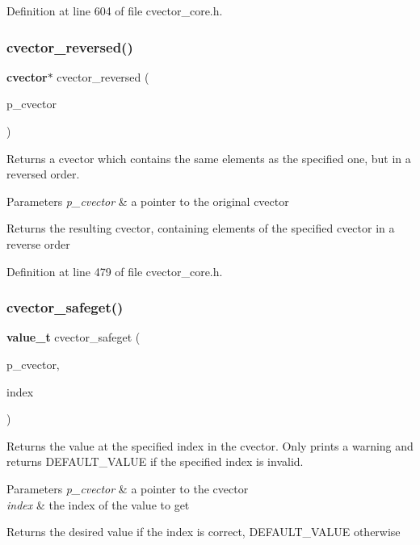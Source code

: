 Definition at line 604 of file cvector\+\_\+core.\+h.

\mbox{\label{cvector__core_8h_af9185ec558ef030b082daee234f9312a}} 
\subsubsection{cvector\+\_\+reversed()}
{\footnotesize\ttfamily \textbf{ cvector}$\ast$ cvector\+\_\+reversed (\begin{DoxyParamCaption}\item[{\textbf{ cvector} $\ast$}]{p\+\_\+cvector }\end{DoxyParamCaption})}

Returns a cvector which contains the same elements as the specified one, but in a reversed order. 
\begin{DoxyParams}{Parameters}
{\em p\+\_\+cvector} & a pointer to the original cvector \\
\hline
\end{DoxyParams}
\begin{DoxyReturn}{Returns}
the resulting cvector, containing elements of the specified cvector in a reverse order 
\end{DoxyReturn}


Definition at line 479 of file cvector\+\_\+core.\+h.

\mbox{\label{cvector__core_8h_a41b0ee17ac9cdc9967afb1dca8f9236a}} 
\subsubsection{cvector\+\_\+safeget()}
{\footnotesize\ttfamily \textbf{ value\+\_\+t} cvector\+\_\+safeget (\begin{DoxyParamCaption}\item[{\textbf{ cvector} $\ast$}]{p\+\_\+cvector,  }\item[{\textbf{ index\+\_\+t}}]{index }\end{DoxyParamCaption})}

Returns the value at the specified index in the cvector. Only prints a warning and returns D\+E\+F\+A\+U\+L\+T\+\_\+\+V\+A\+L\+UE if the specified index is invalid. 
\begin{DoxyParams}{Parameters}
{\em p\+\_\+cvector} & a pointer to the cvector \\
\hline
{\em index} & the index of the value to get \\
\hline
\end{DoxyParams}
\begin{DoxyReturn}{Returns}
the desired value if the index is correct, D\+E\+F\+A\+U\+L\+T\+\_\+\+V\+A\+L\+UE otherwise 
\end{DoxyReturn}


